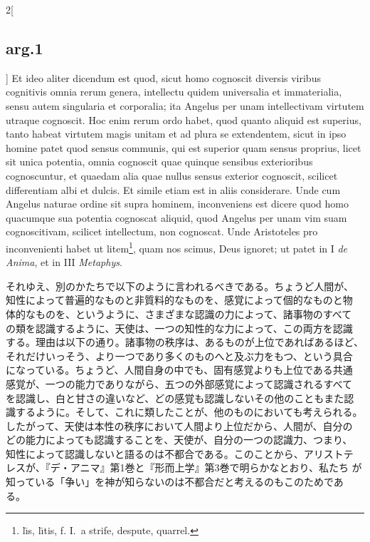 \documentclass[paper=a4paper,fontsize=10pt,jafontsize=9pt,titlepage]{jlreq}
\begin{document}
\begin{paracol}{2}[\subsection{arg.1}]
Et ideo aliter dicendum est quod, sicut homo cognoscit diversis
viribus cognitivis omnia rerum genera, intellectu quidem universalia
et immaterialia, sensu autem singularia et corporalia; ita Angelus per
unam intellectivam virtutem utraque cognoscit. Hoc enim rerum ordo
habet, quod quanto aliquid est superius, tanto habeat virtutem magis
unitam et ad plura se extendentem, sicut in ipso homine patet quod
sensus communis, qui est superior quam sensus proprius, licet sit
unica potentia, omnia cognoscit quae quinque sensibus exterioribus
cognoscuntur, et quaedam alia quae nullus sensus exterior cognoscit,
scilicet differentiam albi et dulcis. Et simile etiam est in aliis
considerare. Unde cum Angelus naturae ordine sit supra hominem,
inconveniens est dicere quod homo quacumque sua potentia cognoscat
aliquid, quod Angelus per unam vim suam cognoscitivam, scilicet
intellectum, non cognoscat. Unde Aristoteles pro inconvenienti habet
ut litem\footnote{l\={\i}s, l\={\i}tis, f. I.~a strife, despute,
quarrel.}, quam nos scimus, Deus ignoret; ut patet in I {\itshape de
Anima}, et in III {\itshape Metaphys}.

\switchcolumn

それゆえ、別のかたちで以下のように言われるべきである。ちょうど人間が、
知性によって普遍的なものと非質料的なものを、感覚によって個的なものと物
体的なものを、というように、さまざまな認識の力によって、諸事物のすべて
の類を認識するように、天使は、一つの知性的な力によって、この両方を認識
する。理由は以下の通り。諸事物の秩序は、あるものが上位であればあるほど、
それだけいっそう、より一つであり多くのものへと及ぶ力をもつ、という具合
になっている。ちょうど、人間自身の中でも、固有感覚よりも上位である共通
感覚が、一つの能力でありながら、五つの外部感覚によって認識されるすべて
を認識し、白と甘さの違いなど、どの感覚も認識しないその他のこともまた認
識するように。そして、これに類したことが、他のものにおいても考えられる。
したがって、天使は本性の秩序において人間より上位だから、人間が、自分の
どの能力によっても認識することを、天使が、自分の一つの認識力、つまり、
知性によって認識しないと語るのは不都合である。このことから、アリストテ
レスが、『デ・アニマ』第1巻と『形而上学』第3巻で明らかなとおり、私たち
が知っている「争い」を神が知らないのは不都合だと考えるのもこのためであ
る。

\switchcolumn*


\end{paracol}
\end{document}
